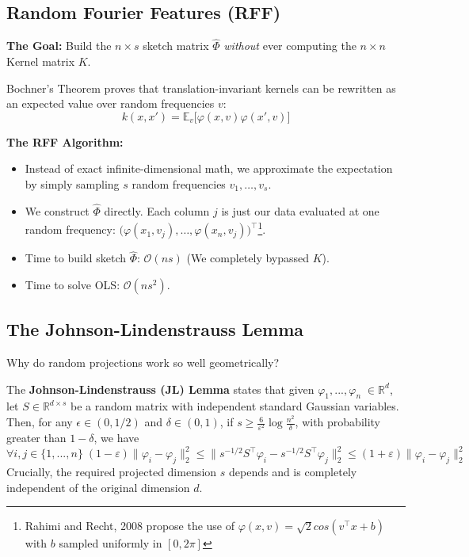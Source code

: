 \documentclass[
11pt,notheorems,hyperref={pdfauthor=whatever}
]{beamer}
\begin{document}
\subsection{Random Fourier Features (RFF)}
\begin{frame}
    \alert{\textbf{The Goal:}} Build the \(n \times s\) sketch matrix \(\hat{\Phi}\) \textit{without} ever computing the \(n \times n\) Kernel matrix \(K\).

    \vspace{0.2cm}
     Bochner's Theorem proves that translation-invariant kernels can be rewritten as an expected value over random frequencies \(v\):
    \[
        k(x, x') = \mathbb{E}_v \big[ \varphi(x, v)\varphi(x', v) \big]
    \]

    \vspace{0.2cm}
    \textbf{The RFF Algorithm:}
    \begin{itemize}
        \item Instead of exact infinite-dimensional math, we approximate the expectation by simply sampling \(s\) random frequencies \(v_1, \dots, v_s\).
        \item We construct \(\hat{\Phi}\) directly. Each column \(j\) is just our data evaluated at one random frequency: \(\big(\varphi(x_1, v_j), \dots, \varphi(x_n, v_j)\big)^\top\)\footnote{Rahimi and Recht, 2008 propose the use of \(\varphi(x, v) = \sqrt{2}cos(v^\top x + b)\) with $b$ sampled uniformly in $[0, 2\pi]$}.
    \end{itemize}

    \vspace{0.2cm}
    \begin{itemize}
        \item Time to build sketch \(\hat{\Phi}\): \textbf{\(\mathcal{O}(ns)\)} (We completely bypassed \(K\)).
        \item Time to solve OLS: \textbf{\(\mathcal{O}(ns^2)\)}.
    \end{itemize}
\end{frame}

\subsection{The Johnson-Lindenstrauss Lemma}
\begin{frame}
    Why do random projections work so well geometrically? 
    
    The \alert{\textbf{Johnson-Lindenstrauss (JL) Lemma}} states that given \(\varphi_1,...,\varphi_n\;\in \mathbb{R}^d\), let \(S \in \mathbb{R}^{d \times s}\) be a random matrix with independent standard Gaussian variables. Then, for any \(\epsilon \in (0, 1/2)\) and \(\delta \in (0, 1)\), if \(s \ge \frac{6}{\varepsilon^2} \log \frac{n^2}{\delta}\), with probability greater than \(1-\delta\), we have
    \[
        \forall i,j \in \{1,...,n\}\;(1-\varepsilon)\|\varphi_i - \varphi_j\|_2^2 \le \|s^{-1/2}S^\top \varphi_i - s^{-1/2}S^\top \varphi_j\|_2^2 \le (1+\varepsilon)\|\varphi_i - \varphi_j\|_2^2
    \]
    Crucially, the required projected dimension \(s\) depends  and is completely independent of the original dimension \(d\).
\end{frame}
\end{document}
